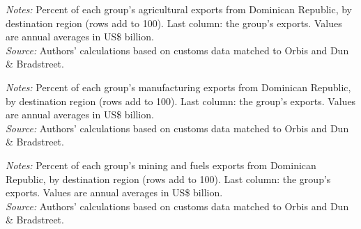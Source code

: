 \documentclass[11pt,a4paper]{article}
\begin{document}
\begin{table}[H]\centering\small%
  \caption{Dominican Republic, Agriculture: Multinational Exports by Parent Region and Destination Region}%
  \label{tab:c_reg_DOM_agro}%
  \par\vspace{3pt}%
  \begin{minipage}{0.95\textwidth}\footnotesize %
  \textit{Notes:} Percent of each group's agricultural exports from Dominican Republic, by destination region (rows add to 100). Last column: the group's exports. Values are annual averages in US\$ billion.\\[3pt]%
  \textit{Source:} Authors' calculations based on customs data matched to Orbis and Dun \& Bradstreet.%
  \end{minipage}%
  \end{table}
\begin{table}[H]\centering\small%
  \caption{Dominican Republic, Manufacturing: Multinational Exports by Parent Region and Destination Region}%
  \label{tab:c_reg_DOM_manufacturing}%
  \par\vspace{3pt}%
  \begin{minipage}{0.95\textwidth}\footnotesize %
  \textit{Notes:} Percent of each group's manufacturing exports from Dominican Republic, by destination region (rows add to 100). Last column: the group's exports. Values are annual averages in US\$ billion.\\[3pt]%
  \textit{Source:} Authors' calculations based on customs data matched to Orbis and Dun \& Bradstreet.%
  \end{minipage}%
  \end{table}
\begin{table}[H]\centering\small%
  \caption{Dominican Republic, Mining and Fuels: Multinational Exports by Parent Region and Destination Region}%
  \label{tab:c_reg_DOM_mining}%
  \par\vspace{3pt}%
  \begin{minipage}{0.95\textwidth}\footnotesize %
  \textit{Notes:} Percent of each group's mining and fuels exports from Dominican Republic, by destination region (rows add to 100). Last column: the group's exports. Values are annual averages in US\$ billion.\\[3pt]%
  \textit{Source:} Authors' calculations based on customs data matched to Orbis and Dun \& Bradstreet.%
  \end{minipage}%
  \end{table}
\end{document}
